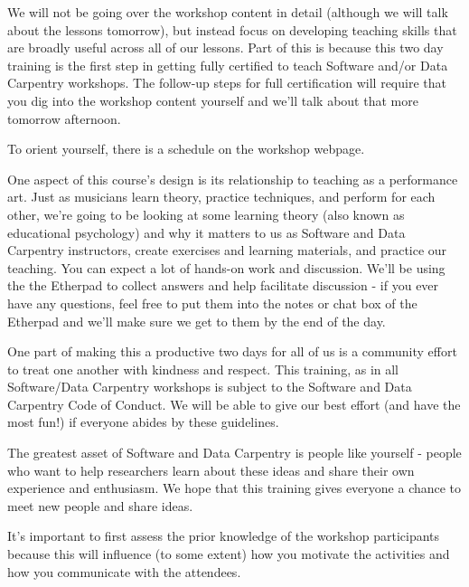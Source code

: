 We will not be going over the workshop content in detail (although we
will talk about the lessons tomorrow), but instead focus on developing
teaching skills that are broadly useful across all of our lessons. Part
of this is because this two day training is the first step in getting
fully certified to teach Software and/or Data Carpentry workshops. The
follow-up steps for full certification will require that you dig into
the workshop content yourself and we'll talk about that more tomorrow
afternoon.

To orient yourself, there is a schedule on the workshop webpage.

One aspect of this course's design is its relationship to teaching as a
performance art. Just as musicians learn theory, practice techniques,
and perform for each other, we're going to be looking at some learning
theory (also known as educational psychology) and why it matters to us
as Software and Data Carpentry instructors, create exercises and
learning materials, and practice our teaching. You can expect a lot of
hands-on work and discussion. We'll be using the the Etherpad to collect
answers and help facilitate discussion - if you ever have any questions,
feel free to put them into the notes or chat box of the Etherpad and
we'll make sure we get to them by the end of the day.

One part of making this a productive two days for all of us is a
community effort to treat one another with kindness and respect. This
training, as in all Software/Data Carpentry workshops is subject to the
Software and Data Carpentry Code of Conduct. We will be able to give our
best effort (and have the most fun!) if everyone abides by these
guidelines.

The greatest asset of Software and Data Carpentry is people like
yourself - people who want to help researchers learn about these ideas
and share their own experience and enthusiasm. We hope that this
training gives everyone a chance to meet new people and share ideas.


It's important to first assess the prior knowledge of the workshop
participants because this will influence (to some extent) how you
motivate the activities and how you communicate with the attendees.

